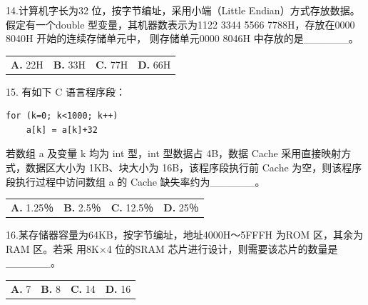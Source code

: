 \documentclass[UTF8,11pt]{ctexart}
\begin{document}
14.计算机字长为32 位，按字节编址，采用小端（Little Endian）方式存放数据。假定有一个double 型变量，其机器数表示为1122 3344 5566 7788H，存放在0000 8040H 开始的连续存储单元中， 则存储单元0000 8046H 中存放的是\_\_\_\_\_\_。


\begin{center}\begin{tabular}{>{\raggedright\arraybackslash}p{\dimexpr(\linewidth-8\tabcolsep)/4\relax}>{\raggedright\arraybackslash}p{\dimexpr(\linewidth-8\tabcolsep)/4\relax}>{\raggedright\arraybackslash}p{\dimexpr(\linewidth-8\tabcolsep)/4\relax}>{\raggedright\arraybackslash}p{\dimexpr(\linewidth-8\tabcolsep)/4\relax}}
\textbf{A.} 22H & \textbf{B.} 33H & \textbf{C.} 77H & \textbf{D.} 66H\\[.35em]\end{tabular}\end{center}

15. 有如下 C 语言程序段：


\begin{Verbatim}[breaklines,breakanywhere,fontsize=\small]
for (k=0; k<1000; k++)
    a[k] = a[k]+32
\end{Verbatim}

若数组 a 及变量 k 均为 int 型，int 型数据占 4B，数据 Cache 采用直接映射方式，数据区大小为 1KB、块大小为 16B，该程序段执行前 Cache 为空，则该程序段执行过程中访问数组 a 的 Cache 缺失率约为\_\_\_\_\_\_。


\begin{center}\begin{tabular}{>{\raggedright\arraybackslash}p{\dimexpr(\linewidth-8\tabcolsep)/4\relax}>{\raggedright\arraybackslash}p{\dimexpr(\linewidth-8\tabcolsep)/4\relax}>{\raggedright\arraybackslash}p{\dimexpr(\linewidth-8\tabcolsep)/4\relax}>{\raggedright\arraybackslash}p{\dimexpr(\linewidth-8\tabcolsep)/4\relax}}
\textbf{A.} 1.\allowbreak{}25％ & \textbf{B.} 2.\allowbreak{}5％ & \textbf{C.} 12.\allowbreak{}5％ & \textbf{D.} 25％\\[.35em]\end{tabular}\end{center}

16.某存储器容量为64KB，按字节编址，地址4000H～5FFFH 为ROM 区，其余为RAM 区。若采 用8K×4 位的SRAM 芯片进行设计，则需要该芯片的数量是\_\_\_\_\_\_。


\begin{center}\begin{tabular}{>{\raggedright\arraybackslash}p{\dimexpr(\linewidth-8\tabcolsep)/4\relax}>{\raggedright\arraybackslash}p{\dimexpr(\linewidth-8\tabcolsep)/4\relax}>{\raggedright\arraybackslash}p{\dimexpr(\linewidth-8\tabcolsep)/4\relax}>{\raggedright\arraybackslash}p{\dimexpr(\linewidth-8\tabcolsep)/4\relax}}
\textbf{A.} 7 & \textbf{B.} 8 & \textbf{C.} 14 & \textbf{D.} 16\\[.35em]\end{tabular}\end{center}
\end{document}
